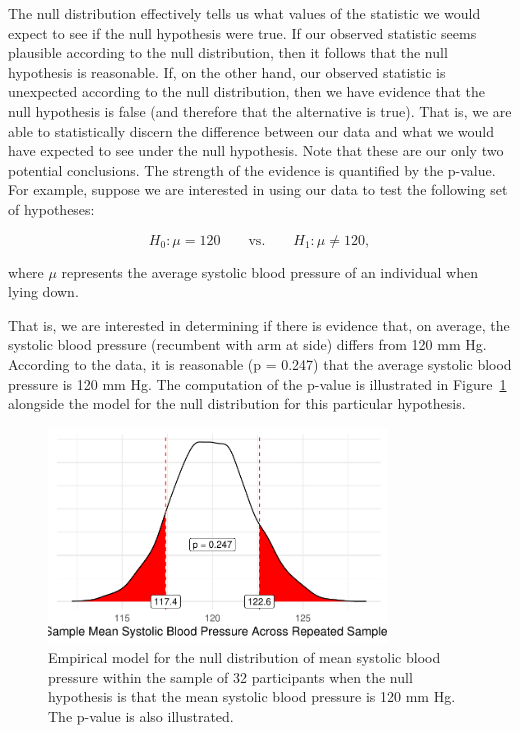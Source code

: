 \documentclass[
  letterpaper,
  DIV=11,
  numbers=noendperiod]{scrreprt}
\theoremstyle{definition}
\theoremstyle{definition}
\theoremstyle{remark}
\begin{document}
The null distribution effectively tells us what values of the statistic
we would expect to see if the null hypothesis were true. If our observed
statistic seems plausible according to the null distribution, then it
follows that the null hypothesis is reasonable. If, on the other hand,
our observed statistic is unexpected according to the null distribution,
then we have evidence that the null hypothesis is false (and therefore
that the alternative is true). That is, we are able to statistically
discern the difference between our data and what we would have expected
to see under the null hypothesis. Note that these are our only two
potential conclusions. The strength of the evidence is quantified by the
p-value. For example, suppose we are interested in using our data to
test the following set of hypotheses:

\[H_0: \mu = 120 \qquad \text{vs.} \qquad H_1: \mu \neq 120,\]

where \(\mu\) represents the average systolic blood pressure of an
individual when lying down.

That is, we are interested in determining if there is evidence that, on
average, the systolic blood pressure (recumbent with arm at side)
differs from 120 mm Hg. According to the data, it is reasonable (p =
0.247) that the average systolic blood pressure is 120 mm Hg. The
computation of the p-value is illustrated in
Figure~\ref{fig-distributional-quartet-null-distribution} alongside the
model for the null distribution for this particular hypothesis.

\begin{figure}

{\centering \includegraphics[width=0.8\textwidth,height=\textheight]{./images/fig-distributional-quartet-null-distribution-1.pdf}

}

\caption{\label{fig-distributional-quartet-null-distribution}Empirical
model for the null distribution of mean systolic blood pressure within
the sample of 32 participants when the null hypothesis is that the mean
systolic blood pressure is 120 mm Hg. The p-value is also illustrated.}

\end{figure}
\end{document}
